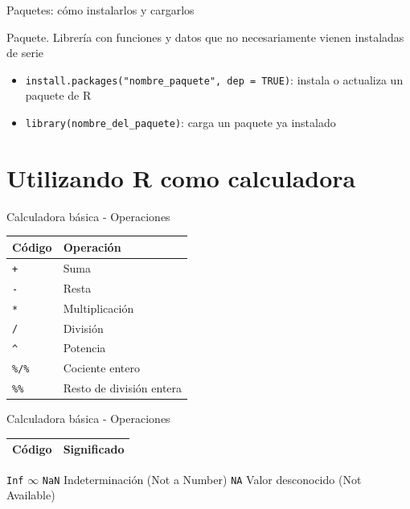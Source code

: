 \documentclass[
  ignorenonframetext,
]{beamer}
\providecommand{\tightlist}{%
  \setlength{\itemsep}{0pt}\setlength{\parskip}{0pt}}
\begin{document}
\begin{frame}[fragile]{Paquetes: cómo instalarlos y cargarlos}
\protect\hypertarget{paquetes-cuxf3mo-instalarlos-y-cargarlos}{}

Paquete. Librería con funciones y datos que no necesariamente vienen
instaladas de serie

\begin{itemize}
\tightlist
\item
  \texttt{install.packages("nombre\_paquete",\ dep\ =\ TRUE)}: instala o
  actualiza un paquete de R
\item
  \texttt{library(nombre\_del\_paquete)}: carga un paquete ya instalado
\end{itemize}

\end{frame}

\hypertarget{utilizando-r-como-calculadora}{%
\section{Utilizando R como
calculadora}\label{utilizando-r-como-calculadora}}

\begin{frame}[fragile]{Calculadora básica - Operaciones}
\protect\hypertarget{calculadora-buxe1sica---operaciones}{}

\begin{longtable}[]{@{}ll@{}}
\toprule
Código & Operación\tabularnewline
\midrule
\endhead
\texttt{+} & Suma\tabularnewline
\texttt{-} & Resta\tabularnewline
\texttt{*} & Multiplicación\tabularnewline
\texttt{/} & División\tabularnewline
\texttt{\^{}} & Potencia\tabularnewline
\texttt{\%/\%} & Cociente entero\tabularnewline
\texttt{\%\%} & Resto de división entera\tabularnewline
\bottomrule
\end{longtable}

\end{frame}

\begin{frame}[fragile]{Calculadora básica - Operaciones}
\protect\hypertarget{calculadora-buxe1sica---operaciones-1}{}

\begin{longtable}[]{@{}ll@{}}
\toprule
Código & Significado\tabularnewline
\midrule
\endhead
\bottomrule
\end{longtable}

\texttt{Inf} \textbar{}
\href{https://es.wikipedia.org/wiki/Infinito}{\(\infty\)} \texttt{NaN}
\textbar{} Indeterminación (Not a Number) \texttt{NA} \textbar{} Valor
desconocido (Not Available)

\end{frame}
\end{document}
